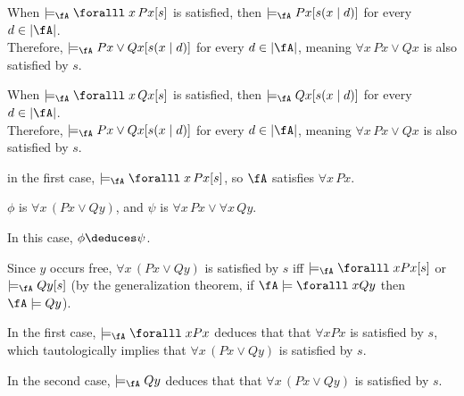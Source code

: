 \begin{problem}
\begin{enumroman}
\begin{Answer}
      \begin{enumroman}
        \item When $\models_\fA \forall x\, Px[s]$ is satisfied,
          then $\models_\fA Px [s(x \mid d)]$ for every $d \in \abs{\fA}$.\\
          Therefore, $\models_\fA Px \lor Qx [s(x \mid d)]$ for every $d \in \abs{\fA}$,
          meaning $\forall x\, Px \lor Qx$ is also satisfied by $s$.
        \item When $\models_\fA \forall x\, Qx[s]$ is satisfied,
          then $\models_\fA Qx [s(x \mid d)]$ for every $d \in \abs{\fA}$.\\
          Therefore, $\models_\fA Px \lor Qx [s(x \mid d)]$ for every $d \in \abs{\fA}$,
          meaning $\forall x\, Px \lor Qx$ is also satisfied by $s$.
      \end{enumroman}
      in the first case, $\models_\fA \forall x\, Px[s]$, so
      $\fA$ satisfies $\forall x\, Px$.
    \end{Answer}
  \item $\phi$ is $\forall x \, (Px \lor Qy)$,
    and $\psi$ is $\forall x\, Px \lor \forall x \, Qy$.
    \begin{Answer}
      In this case, $\phi \deduces \psi$.

      \step

      \step
      Since $y$ occurs free, $\forall x \, (Px \lor Qy)$ is satisfied by $s$ iff
      $\models_{\fA} \forall x Px [s]$ or $\models_{\fA} Qy [s]$
      (by the generalization theorem, if $\fA \models\forall x Qy$
      then $\fA \models Qy$).

      \step
      In the first case, $\models_{\fA} \forall x Px$ deduces that that
      $\forall x Px$ is satisfied by $s$, which
      tautologically implies that $\forall x\, (Px \lor Qy)$ is satisfied by $s$.

      \step
      In the second case, $\models_{\fA} Qy$ deduces that that
      $\forall x\, (Px \lor Qy)$ is satisfied by $s$.

    \end{Answer}
\end{enumroman}

\end{problem}


